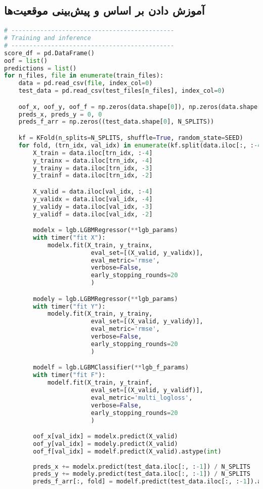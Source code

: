\documentclass{article}
\begin{document}
\subsection*{آموزش دادن بر اساس  و پیش‌بینی موقعیت‌ها}
\begin{latin}
\begin{lstlisting}[language=Python]
# ---------------------------------------------
# Training and inference
# ---------------------------------------------
score_df = pd.DataFrame()
oof = list()
predictions = list()
for n_files, file in enumerate(train_files):
	data = pd.read_csv(file, index_col=0)
	test_data = pd.read_csv(test_files[n_files], index_col=0)

	oof_x, oof_y, oof_f = np.zeros(data.shape[0]), np.zeros(data.shape[0]), np.zeros(data.shape[0])
	preds_x, preds_y = 0, 0
	preds_f_arr = np.zeros((test_data.shape[0], N_SPLITS))

	kf = KFold(n_splits=N_SPLITS, shuffle=True, random_state=SEED)
	for fold, (trn_idx, val_idx) in enumerate(kf.split(data.iloc[:, :-4])):
		X_train = data.iloc[trn_idx, :-4]
		y_trainx = data.iloc[trn_idx, -4]
		y_trainy = data.iloc[trn_idx, -3]
		y_trainf = data.iloc[trn_idx, -2]

		X_valid = data.iloc[val_idx, :-4]
		y_validx = data.iloc[val_idx, -4]
		y_validy = data.iloc[val_idx, -3]
		y_validf = data.iloc[val_idx, -2]

		modelx = lgb.LGBMRegressor(**lgb_params)
		with timer("fit X"):
			modelx.fit(X_train, y_trainx,
						eval_set=[(X_valid, y_validx)],
						eval_metric='rmse',
						verbose=False,
						early_stopping_rounds=20
						)

		modely = lgb.LGBMRegressor(**lgb_params)
		with timer("fit Y"):
			modely.fit(X_train, y_trainy,
						eval_set=[(X_valid, y_validy)],
						eval_metric='rmse',
						verbose=False,
						early_stopping_rounds=20
						)

		modelf = lgb.LGBMClassifier(**lgb_f_params)
		with timer("fit F"):
			modelf.fit(X_train, y_trainf,
						eval_set=[(X_valid, y_validf)],
						eval_metric='multi_logloss',
						verbose=False,
						early_stopping_rounds=20
						)

		oof_x[val_idx] = modelx.predict(X_valid)
		oof_y[val_idx] = modely.predict(X_valid)
		oof_f[val_idx] = modelf.predict(X_valid).astype(int)
		
		preds_x += modelx.predict(test_data.iloc[:, :-1]) / N_SPLITS
		preds_y += modely.predict(test_data.iloc[:, :-1]) / N_SPLITS
		preds_f_arr[:, fold] = modelf.predict(test_data.iloc[:, :-1]).astype(int)
		

\end{lstlisting}
\end{latin}
\end{document}
